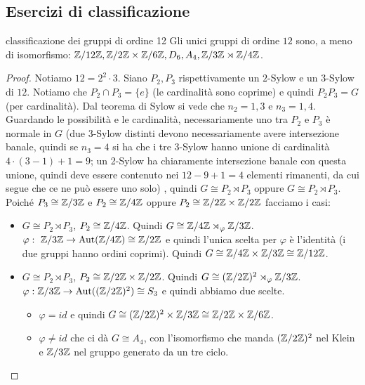 \subsection{Esercizi di classificazione}
\begin{example2}{classificazione dei gruppi di ordine 12}
    Gli unici gruppi di ordine $12$ sono, a meno di isomorfismo: $\mathbb{Z}/12\mathbb{Z}, \mathbb{Z}/2\mathbb{Z}\times \mathbb{Z}/6\mathbb{Z}, D_6, A_4,\mathbb{Z}/3\mathbb{Z} \rtimes \mathbb{Z}/4\mathbb{Z}$.
\end{example2}
\begin{proof}
    Notiamo $12 = 2^2 \cdot 3$. Siano $P_2,P_3$ rispettivamente un $2$-Sylow e un $3$-Sylow di $12$. Notiamo che $P_2 \cap P_3 = \{e\}$ (le cardinalità sono coprime) e quindi $P_2 P_3 = G$ (per cardinalità). Dal teorema di Sylow si vede che $n_2 = 1, 3$ e $n_3 = 1, 4$.
    Guardando le possibilità e le cardinalità, necessariamente uno tra $P_2$ e $P_3$ è normale in $G$ { \tiny (due $3$-Sylow distinti devono necessariamente avere intersezione banale, quindi se $n_3 = 4$ si ha che i tre $3$-Sylow hanno unione di cardinalità $4\cdot (3-1) + 1 = 9$; un 2-Sylow ha chiaramente intersezione banale con questa unione, quindi deve essere contenuto nei $12 - 9 + 1 = 4$ elementi rimanenti, da cui segue che ce ne può essere uno solo) }, quindi $G \cong P_2 \rtimes P_3$ oppure $G \cong P_2 \rtimes P_3$. Poiché $P_3 \cong \mathbb{Z} / 3 \mathbb{Z}$ e $P_2 \cong \mathbb{Z} / 4 \mathbb{Z}$ oppure $P_2 \cong \mathbb{Z} / 2\mathbb{Z} \times \mathbb{Z} / 2\mathbb{Z}$ facciamo i casi: 
    \begin{itemize}
        \item $G \cong P_2 \rtimes P_3$, $P_2 \cong \mathbb{Z} / 4 \mathbb{Z}$. Quindi $G \cong  \mathbb{Z} / 4 \mathbb{Z} \rtimes_{\varphi} \mathbb{Z} / 3 \mathbb{Z}$. $\varphi : \  \mathbb{Z} / 3 \mathbb{Z} \rightarrow \text{Aut}(\mathbb{Z} / 4 \mathbb{Z}) \cong \mathbb{Z} / 2 \mathbb{Z}$ e quindi l'unica scelta per $\varphi$ è l'identità (i due gruppi hanno ordini coprimi). Quindi  $G \cong \mathbb{Z} / 4 \mathbb{Z} \times \mathbb{Z} / 3 \mathbb{Z} \cong \mathbb{Z} / 12 \mathbb{Z}$.
        \item $G \cong P_2 \rtimes P_3$, $P_2 \cong \mathbb{Z}/2\mathbb{Z} \times \mathbb{Z}/2\mathbb{Z}$. Quindi $G \cong  (\mathbb{Z}/2\mathbb{Z})^2 \rtimes_{\varphi} \mathbb{Z} / 3 \mathbb{Z}$. $\varphi :  \mathbb{Z} / 3 \mathbb{Z} \rightarrow \text{Aut}((\mathbb{Z}/2\mathbb{Z})^2) \cong S_3$ e quindi abbiamo due scelte.
        \begin{itemize}
            \item $\varphi = id$ e quindi  $G \cong (\mathbb{Z} / 2 \mathbb{Z})^2 \times \mathbb{Z} / 3 \mathbb{Z} \cong \mathbb{Z} / 2 \mathbb{Z} \times \mathbb{Z} / 6 \mathbb{Z}$.
            \item $\varphi \neq id$ che ci dà $G \cong A_4$, con l'isomorfismo che manda $(\mathbb{Z} / 2 \mathbb{Z})^2$ nel Klein e $\mathbb{Z} / 3 \mathbb{Z}$ nel gruppo generato da un tre ciclo.
        \end{itemize} 

\end{itemize}
\end{proof}
